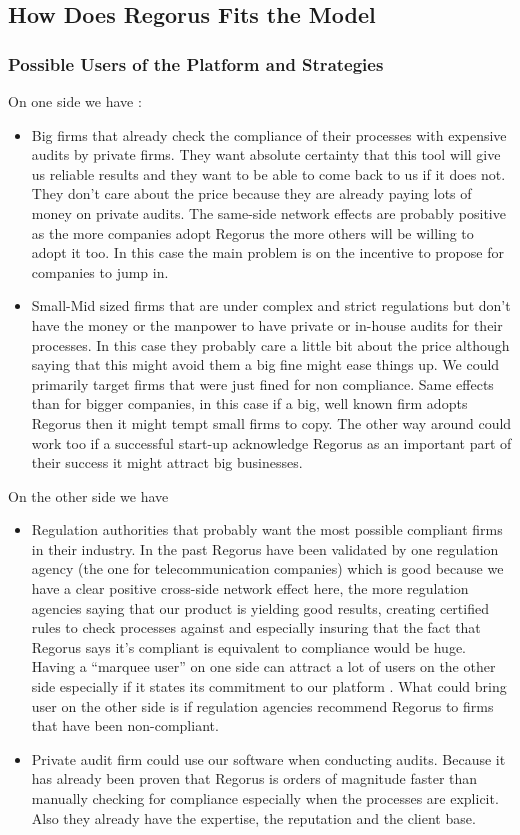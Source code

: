 \documentclass[10pt]{report}
\begin{document}
\subsection{How Does Regorus Fits the Model}

\subsubsection{Possible Users of the Platform and Strategies}
On one side we have :
\begin{itemize}
\item Big firms that already check the compliance of their processes with expensive audits by private firms. They want absolute certainty that this tool will give us reliable results and they want to be able to come back to us if it does not. They don't care about the price because they are already paying lots of money on private audits. The same-side network effects are probably positive as the more companies adopt Regorus the more others will be willing to adopt it too. In this case the main problem is on the incentive to propose for companies to jump in.
\item Small-Mid sized firms that are under complex and strict regulations but don't have the money or the manpower to have private or in-house audits for their processes. In this case they probably care a little bit about the price although saying that this might avoid them a big fine might ease things up. We could primarily target firms that were just fined for non compliance. Same effects than for bigger companies, in this case if a big, well known firm adopts Regorus then it might tempt small firms to copy. The other way around could work too if a successful start-up acknowledge Regorus as an important part of their success it might attract big businesses.
\end{itemize}

On the other side we have
\begin{itemize}
\item Regulation authorities that probably want the most possible compliant firms in their industry. In the past Regorus have been validated by one regulation agency (the one for telecommunication companies) which is good because we have a clear positive cross-side network effect here, the more regulation agencies saying that our product is yielding good results, creating certified rules to check processes against and especially insuring that the fact that Regorus says it's compliant is equivalent to compliance would be huge. Having a \enquote{marquee user} on one side can attract a lot of users on the other side especially if it states its commitment to our platform \autocite{eisenmann2006strategies}. What could bring user on the other side is if regulation agencies recommend Regorus to firms that have been non-compliant. 
\item Private audit firm could use our software when conducting audits. Because it has already been proven that Regorus is orders of magnitude faster than manually checking for compliance especially when the processes are explicit. Also they already have the expertise, the reputation and the client base.
\end{itemize}
\end{document}
